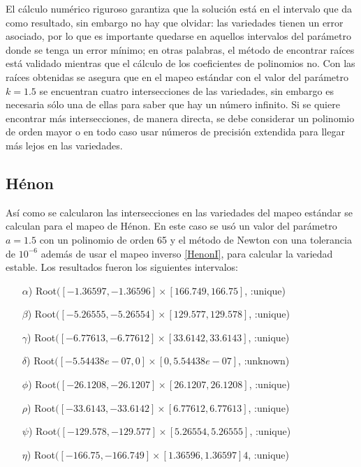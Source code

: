 El cálculo numérico riguroso garantiza que la solución está en el intervalo que da como resultado, sin embargo no hay que olvidar: las variedades tienen un error asociado, por lo que es importante quedarse en aquellos intervalos del parámetro donde se tenga un error mínimo; en otras palabras, el método de encontrar raíces está validado mientras que el cálculo de los coeficientes de polinomios no. Con las raíces obtenidas se asegura que en el mapeo estándar con el valor del parámetro $k=1.5$ se encuentran cuatro intersecciones de las variedades, sin embargo es necesaria sólo una de ellas para saber que hay un número infinito\citep{Ott}. Si se quiere encontrar más intersecciones, de manera directa, se debe considerar un polinomio de orden mayor o en todo caso usar números de precisión extendida para llegar más lejos en las variedades. 



\subsection{Hénon}
Así como se calcularon las intersecciones en las variedades del mapeo estándar se calculan para el mapeo de Hénon. En este caso se usó un valor del parámetro $a=1.5$ con un polinomio de orden 65 y el método de Newton con una tolerancia de $10^{-6}$ además de usar el mapeo inverso \eqref{HenonI}, para calcular la variedad estable. Los resultados fueron los siguientes intervalos:
\begin{itemize}
\item[$\alpha$)] Root$([-1.36597, -1.36596] \times [166.749, 166.75]$, :unique)
\item[$\beta$)] Root$([-5.26555, -5.26554] \times [129.577, 129.578]$, :unique)
\item[$\gamma$)] Root$([-6.77613, -6.77612] \times [33.6142, 33.6143]$, :unique)
\item[$\delta$)] Root$([-5.54438e-07, 0] \times [0, 5.54438e-07]$, :unknown)     
\item[$\phi$)] Root$([-26.1208, -26.1207] \times [26.1207, 26.1208]$, :unique)  
\item[$\rho$)] Root$([-33.6143, -33.6142] \times [6.77612, 6.77613]$, :unique)  
\item[$\psi$)] Root$([-129.578, -129.577] \times [5.26554, 5.26555]$, :unique) 
\item[$\eta$)] Root$([-166.75, -166.749] \times [1.36596, 1.36597]4$, :unique)
\end{itemize}

